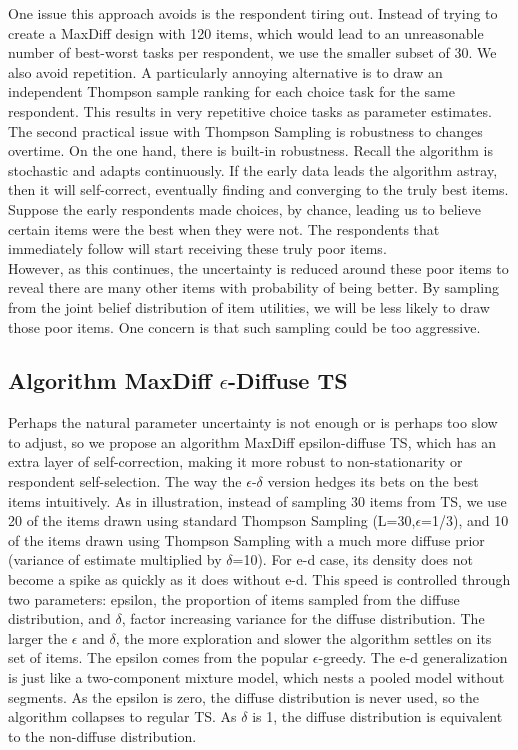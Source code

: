 \documentclass[nonblindrev]{informs3}
\begin{document}
One issue this approach avoids is the respondent tiring out. Instead of trying to create a MaxDiff design with 120 items, which would lead to an unreasonable number of best-worst tasks per respondent, we use the smaller subset of 30.  We also avoid repetition. A particularly annoying alternative is to draw an independent Thompson sample ranking for each choice task for the same respondent. This results in very repetitive choice tasks as parameter estimates. \\
The second practical issue with Thompson Sampling is robustness to changes overtime. On the one hand, there is built-in robustness. Recall the algorithm is stochastic and adapts continuously. If the early data leads the algorithm astray, then it will self-correct, eventually finding and converging to the truly best items. Suppose the early respondents made choices, by chance, leading us to believe certain items were the best when they were not. The respondents that immediately follow will start receiving these truly poor items. \\
However, as this continues, the uncertainty is reduced around these poor items to reveal there are many other items with probability of being better. By sampling from the joint belief distribution of item utilities, we will be less likely to draw those poor items. One concern is that such sampling could be too aggressive.\\
\subsection{Algorithm MaxDiff $\epsilon$-Diffuse TS}
Perhaps the natural parameter uncertainty is not enough or is perhaps too slow to adjust, so we propose an algorithm MaxDiff epsilon-diffuse TS, which has an extra layer of self-correction, making it more robust to non-stationarity or respondent self-selection. 
The way the $\epsilon$-$\delta$ version hedges its bets on the best items intuitively. As in illustration, instead of sampling 30 items from TS, we use 20 of the items drawn using standard Thompson Sampling (L=30,$\epsilon$=1/3), and 10 of the items drawn using Thompson Sampling with a much more diffuse prior (variance of estimate multiplied by $\delta$=10).
For e-d case, its density does not become a spike as quickly as it does without e-d. This speed is controlled through two parameters: epsilon, the proportion of items sampled from the diffuse distribution, and $\delta$, factor increasing variance for the diffuse distribution.  The larger the $\epsilon$ and $\delta$, the more exploration and slower the algorithm settles on its set of items. The epsilon comes from the popular $\epsilon$-greedy.
The e-d generalization is just like a two-component mixture model, which nests a pooled model without segments. As the epsilon is zero, the diffuse distribution is never used, so the algorithm collapses to regular TS. As $\delta$ is 1, the diffuse distribution is equivalent to the non-diffuse distribution. 
\end{document}
